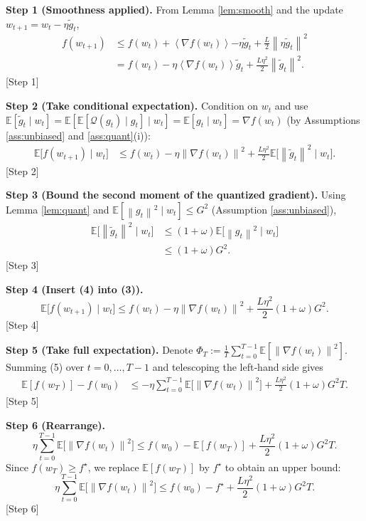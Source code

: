\documentclass{article}
\newcommand{\E}{\mathbb{E}}
\newcommand{\norm}[1]{\left\|#1\right\|}
\newcommand{\inner}[1]{\left\langle #1\right\rangle}
\newcommand{\Q}{\mathcal{Q}}
\begin{document}
\medskip
\noindent\textbf{Step 1 (Smoothness applied).}  
From Lemma \ref{lem:smooth} and the update $w_{t+1}=w_t-\eta\tilde g_t$,
\[
\begin{aligned}
f(w_{t+1})
&\le f(w_t)+\inner{\nabla f(w_t)}{-\eta\tilde g_t}
+\frac{L}{2}\norm{\eta\tilde g_t}^2 \\
&= f(w_t)-\eta\inner{\nabla f(w_t)}{\tilde g_t}
+\frac{L\eta^2}{2}\norm{\tilde g_t}^2 .
\tag{2}
\end{aligned}
\] 
[Step 1]

\medskip
\noindent\textbf{Step 2 (Take conditional expectation).}  
Condition on $w_t$ and use $\E[\tilde g_t\mid w_t]=\E[\E[\Q(g_t)\mid g_t]\mid w_t]=\E[g_t\mid w_t]=\nabla f(w_t)$ (by Assumptions \ref{ass:unbiased} and \ref{ass:quant}(i)):
\[
\begin{aligned}
\E\!\big[f(w_{t+1})\mid w_t\big]
&\le f(w_t)-\eta\norm{\nabla f(w_t)}^2
+\frac{L\eta^2}{2}\E\!\big[\norm{\tilde g_t}^2\mid w_t\big] .
\end{aligned}
\tag{3}
\] 
[Step 2]

\medskip
\noindent\textbf{Step 3 (Bound the second moment of the quantized gradient).}  
Using Lemma \ref{lem:quant} and $\E[\norm{g_t}^2\mid w_t]\le G^2$ (Assumption \ref{ass:unbiased}),
\[
\begin{aligned}
\E\!\big[\norm{\tilde g_t}^2\mid w_t\big]
&\le (1+\omega)\E\!\big[\norm{g_t}^2\mid w_t\big] \\
&\le (1+\omega)G^2 .
\end{aligned}
\tag{4}
\] 
[Step 3]

\medskip
\noindent\textbf{Step 4 (Insert (4) into (3)).}
\[
\E\!\big[f(w_{t+1})\mid w_t\big]
\le f(w_t)-\eta\norm{\nabla f(w_t)}^2
+\frac{L\eta^2}{2}(1+\omega)G^2 .
\tag{5}
\] 
[Step 4]

\medskip
\noindent\textbf{Step 5 (Take full expectation).}  
Denote $\Phi_T:=\frac{1}{T}\sum_{t=0}^{T-1}\E[\norm{\nabla f(w_t)}^2]$. Summing (5) over $t=0,\dots,T-1$ and telescoping the left‑hand side gives
\[
\begin{aligned}
\E[f(w_T)]-f(w_0)
&\le -\eta\sum_{t=0}^{T-1}\E\!\big[\norm{\nabla f(w_t)}^2\big]
+\frac{L\eta^2}{2}(1+\omega)G^2 T .
\end{aligned}
\tag{6}
\] 
[Step 5]

\medskip
\noindent\textbf{Step 6 (Rearrange).}
\[
\eta\sum_{t=0}^{T-1}\E\!\big[\norm{\nabla f(w_t)}^2\big]
\le f(w_0)-\E[f(w_T)]+ \frac{L\eta^2}{2}(1+\omega)G^2 T .
\tag{7}
\] 
Since $f(w_T)\ge f^\star$, we replace $\E[f(w_T)]$ by $f^\star$ to obtain an upper bound:
\[
\eta\sum_{t=0}^{T-1}\E\!\big[\norm{\nabla f(w_t)}^2\big]
\le f(w_0)-f^\star+ \frac{L\eta^2}{2}(1+\omega)G^2 T .
\tag{8}
\] 
[Step 6]
\end{document}
